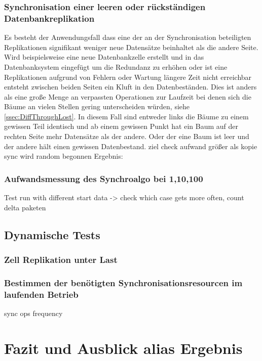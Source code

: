 \documentclass[a4paper,11pt,oneside,%
headsepline,												%
footsepline,												%
bibtotocnumbered									%
]{scrreprt}
\begin{document}
\subsection{Synchronisation einer leeren oder rückständigen Datenbankreplikation}
Es besteht der Anwendungsfall dass eine der an der Synchronisation beteiligten Replikationen signifikant weniger neue Datensätze beinhaltet als die andere Seite. Wird beispielsweise eine neue Datenbankzelle erstellt und in das Datenbanksystem eingefügt um die Redundanz zu erhöhen oder ist eine Replikationen aufgrund von Fehlern oder Wartung längere Zeit nicht erreichbar entsteht zwischen beiden Seiten ein Kluft in den Datenbeständen. Dies ist anders als eine große Menge an verpassten Operationen zur Laufzeit bei denen sich die Bäume an vielen Stellen gering unterscheiden würden, siehe \autoref{ssec:DiffThroughLost}. In diesem Fall sind entweder links die Bäume zu einem gewissen Teil identisch und ab einem gewissen Punkt hat ein Baum auf der rechten Seite mehr Datensätze als der andere. Oder der eine Baum ist leer und der andere hält einen gewissen Datenbestand.
ziel check aufwand größer als kopie
sync wird random begonnen
Ergebnis:
\subsection{Aufwandsmessung des Synchroalgo bei 1,10,100}
\label{ssec:DiffThroughLost}
Test run with different start data -> check which case gets more often, count delta paketen

\section{Dynamische Tests}
\subsection{Zell Replikation unter Last}
\subsection{Bestimmen der benötigten Synchronisationsresourcen im laufenden Betrieb}
sync ops frequency		
\chapter{Fazit und Ausblick alias Ergebnis}
\end{document}
